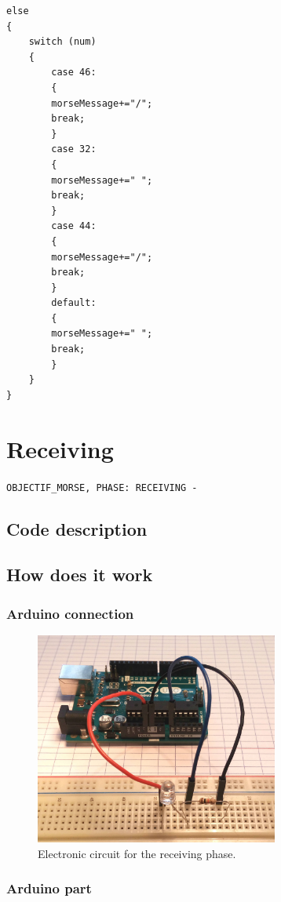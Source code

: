 \documentclass[12pt]{report}
\begin{document}
\begin{snugshade}
\begin{verbatim}
else
{
	switch (num)
	{
		case 46:
		{
		morseMessage+="/";
		break;
		}
		case 32:
		{
		morseMessage+=" ";
		break;
		}
		case 44:
		{
		morseMessage+="/";
		break;
		}
		default:
		{
		morseMessage+=" ";
		break;
		}
	}
}
\end{verbatim}
\end{snugshade}


\newpage

\chapter{Receiving}

\verb|OBJECTIF_MORSE, PHASE: RECEIVING -|


\section{Code description}


\section{How does it work}


\subsection{Arduino connection}

\begin{figure}[H]
\centering\includegraphics[width=8cm]{receive_circuit}
\caption{Electronic circuit for the receiving phase.}				
\label{fig:receiving_circuit}
\end{figure}




\subsection{Arduino part}
\end{document}
